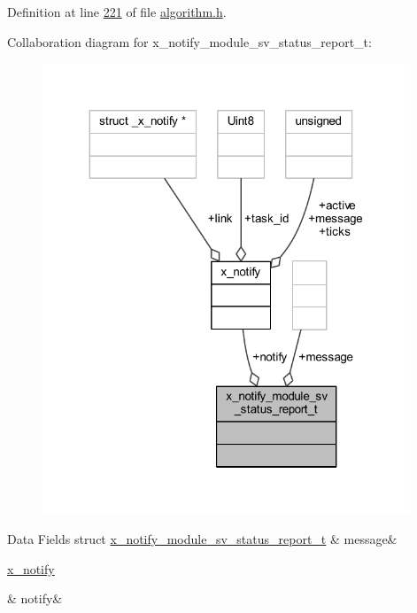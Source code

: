 Definition at line \hyperlink{a00021_source_l00221}{221} of file \hyperlink{a00021_source}{algorithm.\+h}.



Collaboration diagram for x\+\_\+notify\+\_\+module\+\_\+sv\+\_\+status\+\_\+report\+\_\+t\+:\nopagebreak
\begin{figure}[H]
\begin{center}
\leavevmode
\includegraphics[width=311pt]{d1/d8f/a00880}
\end{center}
\end{figure}
\begin{DoxyFields}{Data Fields}
\hypertarget{a00021_a13393a2d1589483b3bae4d2e79f43980}{struct \hyperlink{a00021_dd/d7b/a00865}{x\+\_\+notify\+\_\+module\+\_\+sv\+\_\+status\+\_\+report\+\_\+t}}\label{a00021_a13393a2d1589483b3bae4d2e79f43980}
&
message&
\\
\hline

\hypertarget{a00021_a8e6a04c2283f9fd7b8dcbc62faba5847}{\hyperlink{a00036_df/d4c/a00851}{x\+\_\+notify}}\label{a00021_a8e6a04c2283f9fd7b8dcbc62faba5847}
&
notify&
\\
\hline

\end{DoxyFields}
\label{d6/d66/a00441}
\hypertarget{a00021_d6/d66/a00441}{}

